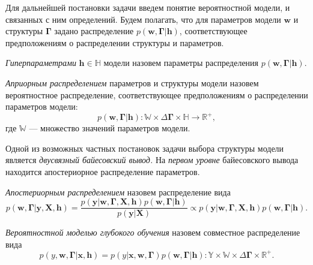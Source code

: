 Для дальнейшей постановки задачи введем понятие вероятностной модели, и связанных с ним определений. Будем полагать, что для параметров модели $\mathbf{w}$ и структуры  $\boldsymbol{\Gamma}$ задано распределение $p(\mathbf{w}, \boldsymbol{\Gamma}|\mathbf{h})$, соответствующее предположениям о распределении структуры и параметров. 

\begin{defin}
\textit{Гиперпараметрами} $\mathbf{h}\in \mathbb{H}$ модели  назовем параметры распределения $p(\mathbf{w}, \boldsymbol{\Gamma}|\mathbf{h})$.
\end{defin}

\begin{defin}
\textit{Априорным распределением} параметров и структуры модели назовем вероятностное распределение, соответствующее предположениям о распределении параметров модели:
\[
    p(\mathbf{w}, \boldsymbol{\Gamma}|\mathbf{h}): \mathbb{W} \times \Delta{\boldsymbol{\Gamma}} \times \mathbb{H} \to \mathbb{R}^{+}, 
\]
где $\mathbb{W}$ --- множество значений параметров модели.
\end{defin}


Одной из возможных частных постановок задачи выбора структуры модели является \textit{двусвязный байесовский вывод.} 
На \textit{первом уровне} байесовского вывода  находится апостериорное распределение параметров.

\begin{defin}
\textit{Апостериорным распределением} назовем распределение вида
\begin{equation}
\label{eq:posterior}
    p(\mathbf{w}, \boldsymbol{\Gamma}|\mathbf{y}, \mathbf{X}, \mathbf{h}) = \frac{p(\mathbf{y}|\mathbf{w}, \boldsymbol{\Gamma}, \mathbf{X}, \mathbf{h})p(\mathbf{w}, \boldsymbol{\Gamma}|\mathbf{h})}{p(\mathbf{y}|\mathbf{X})} \propto p(\mathbf{y}|\mathbf{w},  \boldsymbol{\Gamma}, \mathbf{X}, \mathbf{h}) p(\mathbf{w}, \boldsymbol{\Gamma}|\mathbf{h}).%
\end{equation}
\end{defin}

\begin{defin}
\textit{Вероятностной моделью глубокого обучения} назовем совместное распределение вида
\[
    p({y}, \mathbf{w},  \boldsymbol{\Gamma}|\mathbf{x}, \mathbf{h}) = p({y}|\mathbf{x}, \mathbf{w},  \boldsymbol{\Gamma})p( \mathbf{w},  \boldsymbol{\Gamma}|\mathbf{h}): \mathbb{Y} \times \mathbb{W}  \times \Delta{\boldsymbol{\Gamma}} \times \mathbb{R}^{+}.
\]
\end{defin}

